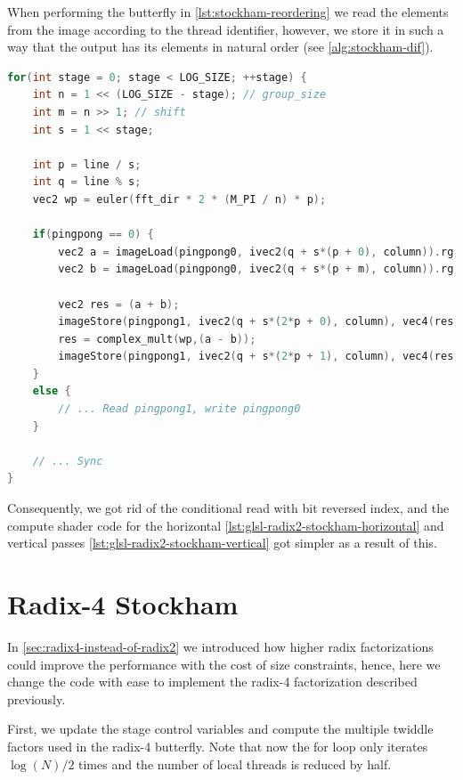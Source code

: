 \documentclass[
  oneside,
  11pt, a4paper,
  footinclude=true,
  headinclude=true,
  cleardoublepage=empty
]{scrbook}
\begin{document}
When performing the butterfly in \autoref{lst:stockham-reordering}  we read the elements from the image according to the thread identifier, however, we store it in such a way that the output has its elements in natural order (see \autoref{alg:stockham-dif}).

\begin{lstlisting}[language=C, caption={Radix-2 Stockham DIF}, label={lst:stockham-reordering}]
for(int stage = 0; stage < LOG_SIZE; ++stage) {
    int n = 1 << (LOG_SIZE - stage); // group_size
    int m = n >> 1; // shift
    int s = 1 << stage;

    int p = line / s;
    int q = line % s;
    vec2 wp = euler(fft_dir * 2 * (M_PI / n) * p);
    
    if(pingpong == 0) {
        vec2 a = imageLoad(pingpong0, ivec2(q + s*(p + 0), column)).rg;
        vec2 b = imageLoad(pingpong0, ivec2(q + s*(p + m), column)).rg;

        vec2 res = (a + b);
        imageStore(pingpong1, ivec2(q + s*(2*p + 0), column), vec4(res,0,0));
        res = complex_mult(wp,(a - b));
        imageStore(pingpong1, ivec2(q + s*(2*p + 1), column), vec4(res,0,0));
    }
    else {
        // ... Read pingpong1, write pingpong0
    }
    
    // ... Sync
}
\end{lstlisting}

Consequently, we got rid of the conditional read with bit reversed index, and the compute shader code for the horizontal \autoref{lst:glsl-radix2-stockham-horizontal} and vertical passes \autoref{lst:glsl-radix2-stockham-vertical} got simpler as a result of this.

\section{Radix-4 Stockham} \label{subsec:radix4-stockham}

In \autoref{sec:radix4-instead-of-radix2} we introduced how higher radix factorizations could improve the performance with the cost of size constraints, hence, here we change the code with ease to implement the radix-4 factorization described previously.
\newline

First, we update the stage control variables and compute the multiple twiddle factors used in the radix-4 butterfly. Note that now the for loop only iterates $\log{(N)}/2$ times and the number of local threads is reduced by half.
\end{document}
